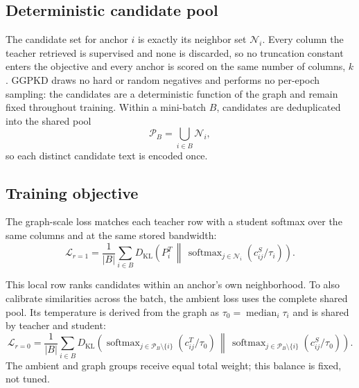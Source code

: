 \subsection{Deterministic candidate pool}
\label{sec:candidates}

The candidate set for anchor $i$ is exactly its neighbor set $\mathcal N_i$.
Every column the teacher retrieved is supervised and none is discarded, so no
truncation constant enters the objective and every anchor is scored on the same
number of columns, $k$. GGPKD draws no hard or random negatives and performs no
per-epoch sampling: the candidates are a deterministic function of the graph and
remain fixed throughout training. Within a mini-batch $B$, candidates are
deduplicated into the shared pool
\begin{equation}
\mathcal P_B=\bigcup_{i\in B}\mathcal N_i,
\label{eq:shared-pool}
\end{equation}
so each distinct candidate text is encoded once.

\subsection{Training objective}
\label{sec:objective}

The graph-scale loss matches each teacher row with a student softmax over the
same columns and at the same stored bandwidth:
\begin{equation}
\mathcal L_{r=1}
=\frac{1}{|B|}\sum_{i\in B}
D_{\mathrm{KL}}\!\left(
P_i^T
\,\middle\|\,
\operatorname{softmax}_{j\in\mathcal N_i}(c_{ij}^S/\tau_i)
\right).
\label{eq:graph-loss}
\end{equation}

This local row ranks candidates within an anchor's own neighborhood. To also
calibrate similarities across the batch, the ambient loss uses the complete
shared pool. Its temperature is derived from the graph as
$\tau_0=\operatorname{median}_i\tau_i$ and is shared by teacher and student:
\begin{equation}
\mathcal L_{r=0}
=\frac{1}{|B|}\sum_{i\in B}
D_{\mathrm{KL}}\!\left(
\operatorname{softmax}_{j\in\mathcal P_B\setminus\{i\}}(c_{ij}^T/\tau_0)
\,\middle\|\,
\operatorname{softmax}_{j\in\mathcal P_B\setminus\{i\}}(c_{ij}^S/\tau_0)
\right).
\label{eq:ambient-loss}
\end{equation}
The ambient and graph groups receive equal total weight; this balance is fixed,
not tuned.

